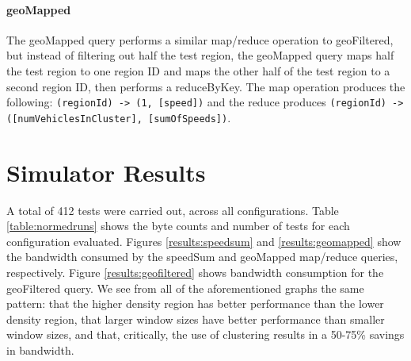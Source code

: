 \documentclass{thesis}
\begin{document}
    \paragraph{geoMapped}
        The geoMapped query performs a similar map/reduce operation to geoFiltered, but instead of filtering out half the
        test region, the geoMapped query maps half the test region to one region ID and maps the other half of the
        test region to a second region ID, then performs a reduceByKey. The map operation produces the following:
        \verb|(regionId) -> (1, [speed])| and the reduce produces \verb|(regionId) -> ([numVehiclesInCluster], [sumOfSpeeds])|.

\section{Simulator Results}

   A total of 412 tests were carried out, across all configurations. Table \ref{table:normedruns} shows
   the byte counts and number of tests for each configuration evaluated.
   Figures \ref{results:speedsum} and \ref{results:geomapped} show the bandwidth consumed by the speedSum
   and geoMapped map/reduce queries, respectively. Figure \ref{results:geofiltered} shows bandwidth consumption
   for the geoFiltered query. We see from all of the aforementioned graphs the same pattern: that
   the higher density region has better performance than the lower density region, that larger window
   sizes have better performance than smaller window sizes, and that, critically, the use of clustering
   results in a 50-75\% savings in bandwidth.
\end{document}

